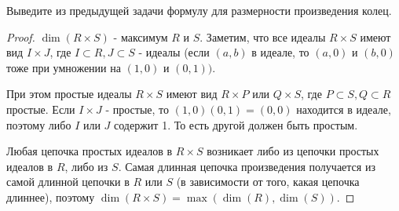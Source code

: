 \begin{prob}
Выведите из предыдущей задачи формулу для размерности произведения колец.
\end{prob}
\begin{proof}
$\operatorname{dim}(R \times S)$ - максимум $R$ и $S$.
Заметим, что все идеалы $R \times S$ имеют вид $I \times J$, где $I \subset R, J \subset S$ - идеалы (если $(a, b)$ в идеале, то $(a, 0)$ и $(b, 0)$ тоже при умножении на $(1,0)$ и $(0,1))$.

При этом простые идеалы $R \times S$ имеют вид $R \times P$ или $Q \times S$, где $P \subset S, Q \subset R$ простые. Если $I \times J$ - простые, то $(1,0)(0,1)=(0,0)$ находится в идеале, поэтому либо $I$ или $J$ содержит 1. То есть другой должен быть простым.

Любая цепочка простых идеалов в $R \times S$ возникает либо из цепочки простых идеалов в $R$, либо из $S$. Самая длинная цепочка произведения получается из самой длинной цепочки в $R$ или $S$ (в зависимости от того, какая цепочка длиннее), поэтому $\operatorname{dim}(R \times S)=\max (\operatorname{dim}(R), \operatorname{dim}(S))$.
\end{proof}
\begin{comment}
https://math.stackexchange.com/questions/191667/dimension-of-a-tensor-product-of-affine-rings#:~:text=Let%
https://dept.math.lsa.umich.edu/~hochster/615W10/supNoeth.pdf
https://www.math.toronto.edu/undergrad/projects-undergrad/Presentation1byBai_HilPol_Dim2016S.pdf
\end{comment}
\vskip 0.6in





